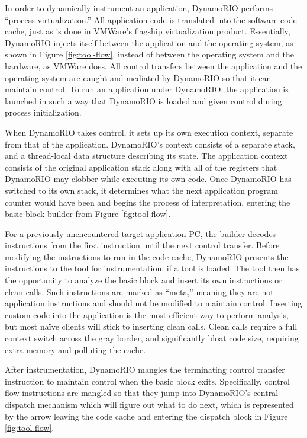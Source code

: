 In order to dynamically instrument an application, DynamoRIO performs ``process
virtualization.''  All application code is translated into the software code
cache, just as is done in VMWare's flagship virtualization
product.\cite{vmware_comparison}  Essentially, DynamoRIO injects itself between
the application and the operating system, as shown in Figure
\ref{fig:tool-flow}, instead of between the operating system and the hardware,
as VMWare does.  All control transfers between the application and the operating
system are caught and mediated by DynamoRIO so that it can maintain control.  To
run an application under DynamoRIO, the application is launched in such a way
that DynamoRIO is loaded and given control during process initialization.

When DynamoRIO takes control, it sets up its own execution context, separate
from that of the application.  DynamoRIO's context consists of a separate stack,
and a thread-local data structure describing its state.  The application context
consists of the original application stack along with all of the registers that
DynamoRIO may clobber while executing its own code.  Once DynamoRIO has switched
to its own stack, it determines what the next application program counter would
have been and begins the process of interpretation, entering the basic block
builder from Figure \ref{fig:tool-flow}.

For a previously unencountered target application PC, the builder decodes
instructions from the first instruction until the next control transfer.  Before
modifying the instructions to run in the code cache, DynamoRIO presents the
instructions to the tool for instrumentation, if a tool is loaded.  The tool
then has the opportunity to analyze the basic block and insert its own
instructions or clean calls.  Such instructions are marked as ``meta,'' meaning
they are not application instructions and should not be modified to maintain
control.  Inserting custom code into the application is the most efficient way
to perform analysis, but most na\"ive clients will stick to inserting clean
calls.  Clean calls require a full context switch across the gray border, and
significantly bloat code size, requiring extra memory and polluting the cache.

After instrumentation, DynamoRIO mangles the terminating control transfer
instruction to maintain control when the basic block exits.  Specifically,
control flow instructions are mangled so that they jump into DynamoRIO's central
dispatch mechanism which will figure out what to do next, which is represented
by the arrow leaving the code cache and entering the dispatch block in Figure
\ref{fig:tool-flow}.

